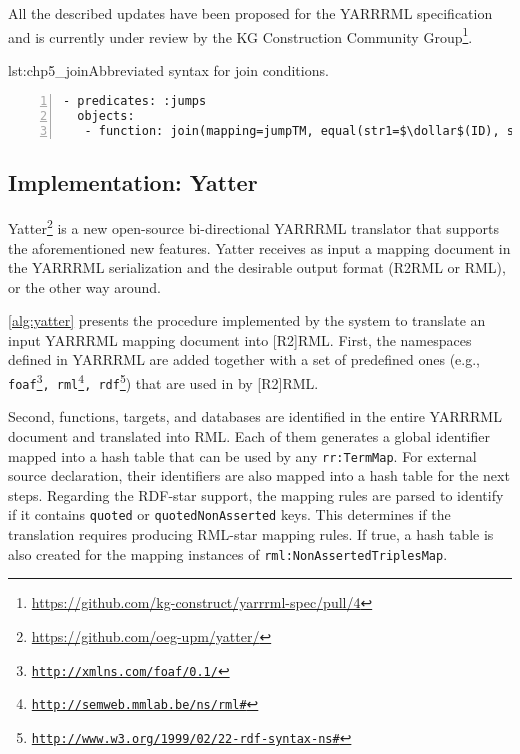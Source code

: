 All the described updates have been proposed for the YARRRML specification and is currently under review by the KG Construction Community Group\footnote{\url{https://github.com/kg-construct/yarrrml-spec/pull/4}}.

\begin{minipage}{\linewidth}
\centering
\begin{captionedlisting}{lst:chp5_join}{Abbreviated syntax for join conditions.}
\centering
{\begin{lstlisting}[numbers=left,basicstyle=\ttfamily\small,columns=flexible]
- predicates: :jumps
  objects:
   - function: join(mapping=jumpTM, equal(str1=$\dollar$(ID), str2=$\dollar$(ID)))
\end{lstlisting}}
\end{captionedlisting}
\end{minipage}





\subsection{Implementation: Yatter}

Yatter\footnote{\label{foot:yatter}\url{https://github.com/oeg-upm/yatter/}} is a new open-source bi-directional YARRRML translator that supports the aforementioned new features. 
Yatter receives as input a mapping document in the YARRRML serialization and the desirable output format (R2RML or RML), or the other way around.




\cref{alg:yatter} presents the procedure implemented by the system to translate an input YARRRML mapping document into [R2]RML. 
First, %
the namespaces defined in YARRRML are added together with a set of predefined ones (e.g., \texttt{foaf\footnote{\url{http://xmlns.com/foaf/0.1/}}, rml\footnote{\url{http://semweb.mmlab.be/ns/rml\#}}, rdf\footnote{\url{http://www.w3.org/1999/02/22-rdf-syntax-ns\#}}}) that are used in by [R2]RML. 

Second, functions, targets, and databases are identified in the entire YARRRML document and translated into RML. Each of them generates a global identifier mapped into a hash table that can be used by any \texttt{rr:TermMap}. For external source declaration, their identifiers are also mapped into a hash table for the next steps.
Regarding the RDF-star support, the mapping rules are parsed to identify if it contains \texttt{quoted} or \texttt{quotedNonAsserted} keys.
This determines if the translation requires producing RML-star mapping rules.
If true, a hash table is also created for the mapping instances of \texttt{rml:NonAssertedTriplesMap}.


